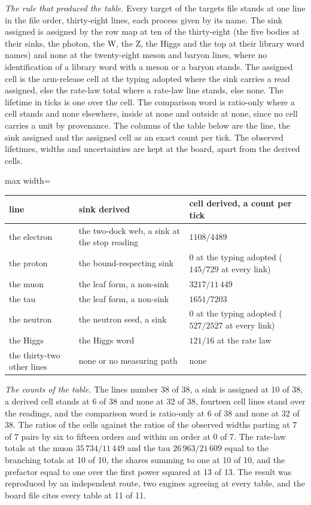 \begin{chproof}
\textit{The rule that produced the table.} Every target of the targets file stands at one line in the file order, thirty-eight lines, each process given by its name. The sink assigned is assigned by the row map at ten of the thirty-eight (the five bodies at their sinks, the photon, the W, the Z, the Higgs and the top at their library word names) and none at the twenty-eight meson and baryon lines, where no identification of a library word with a meson or a baryon stands. The assigned cell is the arm-release cell at the typing adopted where the sink carries a read assigned, else the rate-law total where a rate-law line stands, else none. The lifetime in ticks is one over the cell. The comparison word is ratio-only where a cell stands and none elsewhere, inside at none and outside at none, since no cell carries a unit by provenance. The columns of the table below are the line, the sink assigned and the assigned cell as an exact count per tick. The observed lifetimes, widths and uncertainties are kept at the board, apart from the derived cells.

\begin{center}
\begin{adjustbox}{max width=\linewidth}\begin{tabular}{lll}
\hline
line & sink derived & cell derived, a count per tick \\
\hline
the electron & the two-dock web, a sink at the stop reading & $1108/4489$ \\
the proton & the bound-respecting sink & $0$ at the typing adopted ($145/729$ at every link) \\
the muon & the leaf form, a non-sink & $3217/11\,449$ \\
the tau & the leaf form, a non-sink & $1651/7203$ \\
the neutron & the neutron seed, a sink & $0$ at the typing adopted ($527/2527$ at every link) \\
the Higgs & the Higgs word & $121/16$ at the rate law \\
the thirty-two other lines & none or no measuring path & none \\
\hline
\end{tabular}\end{adjustbox}
\end{center}

\textit{The counts of the table.} The lines number 38 of 38, a sink is assigned at 10 of 38, a derived cell stands at 6 of 38 and none at 32 of 38, fourteen cell lines stand over the readings, and the comparison word is ratio-only at 6 of 38 and none at 32 of 38. The ratios of the cells against the ratios of the observed widths parting at 7 of 7 pairs by six to fifteen orders and within an order at 0 of 7. The rate-law totals at the muon $35\,734/11\,449$ and the tau $26\,963/21\,609$ equal to the branching totals at 10 of 10, the shares summing to one at 10 of 10, and the prefactor equal to one over the first power squared at 13 of 13. The result was reproduced by an independent route, two engines agreeing at every table, and the board file cites every table at 11 of 11.
\end{chproof}
